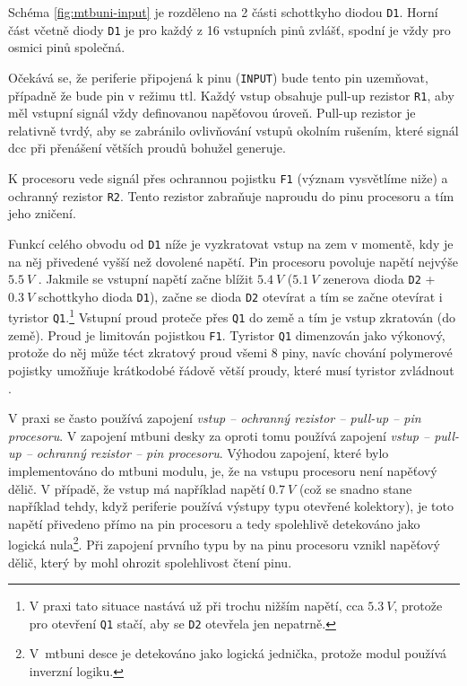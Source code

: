 Schéma \ref{fig:mtbuni-input} je rozděleno na 2 části schottkyho diodou
\texttt{D1}. Horní část včetně diody \texttt{D1} je pro každý z 16 vstupních
pinů zvlášť, spodní je vždy pro osmici pinů společná.

Očekává se, že periferie připojená k pinu (\texttt{INPUT}) bude tento pin
uzemňovat, případně že bude pin v režimu \gls{ttl}. Každý vstup obsahuje
pull-up rezistor \texttt{R1}, aby měl vstupní signál vždy definovanou napěťovou
úroveň. Pull-up rezistor je relativně tvrdý, aby se zabránilo ovlivňování
vstupů okolním rušením, které signál \gls{dcc} při přenášení větších proudů
bohužel generuje.

K procesoru vede signál přes ochrannou pojistku \texttt{F1} (význam vysvětlíme
niže) a ochranný rezistor \texttt{R2}. Tento rezistor zabraňuje naproudu do pinu
procesoru a tím jeho zničení.

Funkcí celého obvodu od \texttt{D1} níže je vyzkratovat vstup na zem v momentě,
kdy je na něj přivedené vyšší než dovolené napětí. Pin procesoru povoluje
napětí nejvýše $5.5~V$ \cite{atmega128-datasheet}. Jakmile se vstupní napětí
začne blížit $5.4~V$ ($5.1~V$ zenerova dioda \texttt{D2} + $0.3~V$ schottkyho
dioda \texttt{D1}), začne se dioda \texttt{D2} otevírat a tím se začne otevírat
i tyristor \texttt{Q1}.\footnote{V praxi tato situace nastává už při trochu
nižším napětí, cca $5.3~V$, protože pro otevření \texttt{Q1} stačí, aby se
\texttt{D2} otevřela jen nepatrně.} Vstupní proud proteče přes \texttt{Q1} do
země a tím je vstup zkratován (do země). Proud je limitován pojistkou \texttt{F1}.
Tyristor \texttt{Q1} dimenzován jako výkonový, protože do něj může téct zkratový
proud všemi 8 piny, navíc chování polymerové pojistky umožňuje krátkodobé řádově
větší proudy, které musí tyristor zvládnout \cite{polyfuse-behavior}.

V praxi se často používá zapojení \textit{vstup – ochranný rezistor – pull-up –
pin procesoru}. V zapojení \gls{mtbuni} desky za oproti tomu používá zapojení
\textit{vstup – pull-up – ochranný rezistor – pin procesoru}. Výhodou zapojení,
které bylo implementováno do \gls{mtbuni} modulu, je, že na vstupu procesoru
není napěťový dělič. V případě, že vstup má například napětí $0.7~V$ (což se
snadno stane například tehdy, když periferie používá výstupy typu otevřené
kolektory), je toto napětí přivedeno přímo na pin procesoru a tedy spolehlivě
detekováno jako logická nula\footnote{V~\gls{mtbuni} desce je detekováno
jako logická jednička, protože modul používá inverzní logiku.}. Při zapojení
prvního typu by na pinu procesoru vznikl napěťový dělič, který by mohl ohrozit
spolehlivost čtení pinu.

